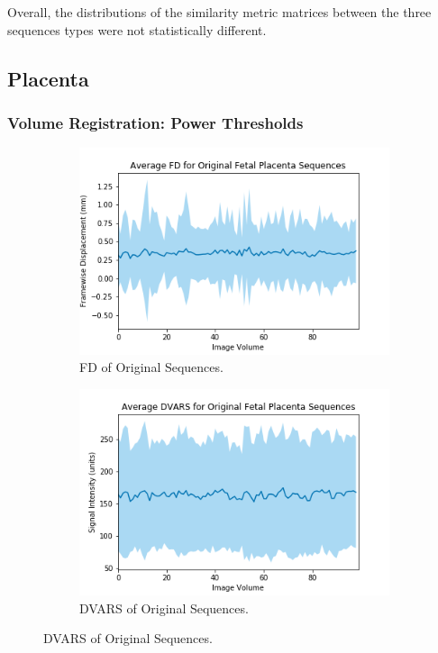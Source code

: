 Overall, the distributions of the similarity metric matrices between the three sequences types were not statistically different.

\subsection{Placenta}

\subsubsection{Volume Registration: Power Thresholds}

\begin{figure}[]
	\centering
	\begin{subfigure}{0.4\textwidth}
		\centering
		\includegraphics[width=1.0\textwidth]{6/figures/fetal-placenta-bold-fd-150.png}
		\caption{FD of Original Sequences.}
	\end{subfigure}
	\hspace{0.05\textwidth}
	\begin{subfigure}{0.4\textwidth}
		\centering
		\includegraphics[width=1.0\textwidth]{6/figures/fetal-placenta-bold-dvars-150.png}
		\caption{DVARS of Original Sequences.}
	\end{subfigure}
	

\end{figure}
